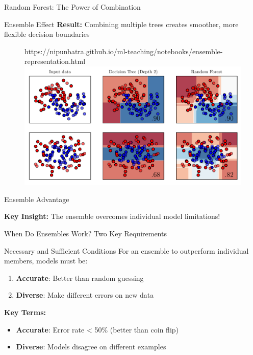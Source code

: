 \documentclass[9pt]{beamer}
\newcommand{\fitpic}[1]{\begin{adjustbox}{max width=\linewidth, max totalheight=0.78\textheight}#1\end{adjustbox}}
\begin{document}
\begin{frame}{Random Forest: The Power of Combination}
\begin{examplebox}{Ensemble Effect}
\textbf{Result:} Combining multiple trees creates smoother, more flexible decision boundaries
\end{examplebox}

  \begin{figure}[htp]
    \centering
    \begin{notebookbox}{https://nipunbatra.github.io/ml-teaching/notebooks/ensemble-representation.html}
      \fitpic{\includegraphics[scale=0.6]{../assets/ensemble/figures/2-representation.pdf}}
    \end{notebookbox}
  \end{figure}
\end{frame}
  
\begin{frame}{Ensemble Advantage}
\begin{keypointsbox}
\textbf{Key Insight:} The ensemble overcomes individual model limitations!
\end{keypointsbox}
\end{frame}




\begin{frame}{When Do Ensembles Work? Two Key Requirements}
\begin{definitionbox}{Necessary and Sufficient Conditions}
For an ensemble to outperform individual members, models must be:
\begin{enumerate}
\item \textbf{Accurate}: Better than random guessing
\item \textbf{Diverse}: Make different errors on new data
\end{enumerate}
\end{definitionbox}

\begin{keypointsbox}
\textbf{Key Terms:}
\begin{itemize}
\item \textbf{Accurate}: Error rate < 50\% (better than coin flip)
\item \textbf{Diverse}: Models disagree on different examples
\end{itemize}
\end{keypointsbox}
\end{frame}
\end{document}
